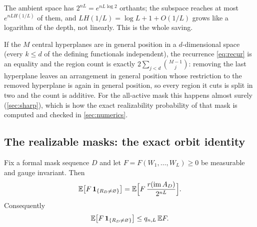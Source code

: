 The ambient space has $2^{nL}=e^{nL\log 2}$ orthants; the subspace reaches at most $e^{nLH(1/L)}$ of them, and $LH(1/L)=\log L+1+O(1/L)$ grows like a logarithm of the depth, not linearly. This is the whole saving.

\begin{remark}
If the $M$ central hyperplanes are in general position in a $d$-dimensional space (every $k\le d$ of the defining functionals independent), the recurrence \cref{eq:recur} is an equality and the region count is exactly $2\sum_{j<d}\binom{M-1}{j}$: removing the last hyperplane leaves an arrangement in general position whose restriction to the removed hyperplane is again in general position, so every region it cuts is split in two and the count is additive. For the all-active mask this happens almost surely (\cref{sec:sharp}), which is how the exact realizability probability of that mask is computed and checked in \cref{sec:numerics}.
\end{remark}

\subsection{The realizable masks: the exact orbit identity}

\begin{proposition}\label{prop:orbit}
Fix a formal mask sequence $D$ and let $F=F(W_1,\dots,W_L)\ge 0$ be measurable and gauge invariant. Then
\begin{equation}\label{eq:orbit}
\mathbb{E}\bigl[F\,\mathbf{1}_{\{R_D\ne\varnothing\}}\bigr]=\mathbb{E}\Bigl[F\,\frac{r(\operatorname{im} A_D)}{2^{nL}}\Bigr].
\end{equation}
Consequently
\begin{equation}\label{eq:orbit-bound}
\mathbb{E}\bigl[F\,\mathbf{1}_{\{R_D\ne\varnothing\}}\bigr]\le q_{n,L}\,\mathbb{E} F .
\end{equation}
\end{proposition}

